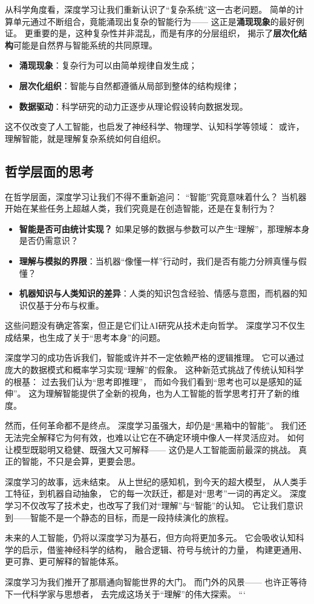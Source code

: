 从科学角度看，深度学习让我们重新认识了“复杂系统”这一古老问题。  
简单的计算单元通过不断组合，竟能涌现出复杂的智能行为——  
这正是\textbf{涌现现象}的最好例证。  
更重要的是，这种复杂性并非混乱，而是有序的分层组织，  
揭示了\textbf{层次化结构}可能是自然界与智能系统的共同原理。  

\begin{itemize}
\item \textbf{涌现现象}：复杂行为可以由简单规律自发生成；
\item \textbf{层次化组织}：智能与自然都遵循从局部到整体的结构规律；
\item \textbf{数据驱动}：科学研究的动力正逐步从理论假设转向数据发现。
\end{itemize}

这不仅改变了人工智能，也启发了神经科学、物理学、认知科学等领域：  
或许，理解智能，就是理解复杂系统如何自组织。

\subsection{哲学层面的思考}

在哲学层面，深度学习让我们不得不重新追问：  
“智能”究竟意味着什么？  
当机器开始在某些任务上超越人类，我们究竟是在创造智能，还是在复制行为？  

\begin{itemize}
\item \textbf{智能是否可由统计实现？}  
如果足够的数据与参数可以产生“理解”，那理解本身是否仍需意识？
\item \textbf{理解与模拟的界限}：当机器“像懂一样”行动时，我们是否有能力分辨真懂与假懂？
\item \textbf{机器知识与人类知识的差异}：人类的知识包含经验、情感与意图，而机器的知识仅基于分布与权重。
\end{itemize}

这些问题没有确定答案，但正是它们让AI研究从技术走向哲学。  
深度学习不仅生成结果，也生成了关于“思考本身”的问题。

深度学习的成功告诉我们，智能或许并不一定依赖严格的逻辑推理。  
它可以通过庞大的数据模式和概率学习实现“理解”的假象。  
这种新范式挑战了传统认知科学的根基：  
过去我们认为“思考即推理”，  
而如今我们看到“思考也可以是感知的延伸”。  
这为理解智能提供了全新的视角，也为人工智能的哲学思考打开了新的维度。

然而，任何革命都不是终点。  
深度学习虽强大，却仍是“黑箱中的智能”。  
我们还无法完全解释它为何有效，也难以让它在不确定环境中像人一样灵活应对。  
如何让模型既聪明又稳健、既强大又可解释——  
这仍是人工智能面前最深的挑战。  
真正的智能，不只是会算，更要会思。

深度学习的故事，远未结束。  
从上世纪的感知机，到今天的超大模型，  
从人类手工特征，到机器自动抽象，  
它的每一次跃迁，都是对“思考”一词的再定义。  
深度学习不仅改写了技术史，也改写了我们对“理解”与“智能”的认知。  
它让我们意识到——智能不是一个静态的目标，而是一段持续演化的旅程。

未来的人工智能，仍将以深度学习为基石，但方向将更加多元。  
它会吸收认知科学的启示，借鉴神经科学的结构，  
融合逻辑、符号与统计的力量，  
构建更通用、更可靠、更可解释的智能体系。  

深度学习为我们推开了那扇通向智能世界的大门。  
而门外的风景——  
也许正等待下一代科学家与思想者，  
去完成这场关于“理解”的伟大探索。
```
